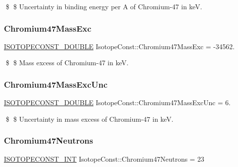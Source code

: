 \$ \$ Uncertainty in binding energy per A of Chromium-\/47 in keV. \mbox{\label{group___isotope_const-_chromium-_cr47_ga3ac7f5e06ba9161b9e15e8467bbdb04a}} 
\subsubsection{\texorpdfstring{Chromium47\+Mass\+Exc}{Chromium47MassExc}}
{\footnotesize\ttfamily \mbox{\hyperlink{group___isotope_const-_macros_ga8f45a7272ce02c0b4c65c44636ed719a}{I\+S\+O\+T\+O\+P\+E\+C\+O\+N\+S\+T\+\_\+\+D\+O\+U\+B\+LE}} Isotope\+Const\+::\+Chromium47\+Mass\+Exc = -\/34562.}

\$ \$ Mass excess of Chromium-\/47 in keV. \mbox{\label{group___isotope_const-_chromium-_cr47_gaa1ed85c141b5e8d51eeac6ac1e14ef1d}} 
\subsubsection{\texorpdfstring{Chromium47\+Mass\+Exc\+Unc}{Chromium47MassExcUnc}}
{\footnotesize\ttfamily \mbox{\hyperlink{group___isotope_const-_macros_ga8f45a7272ce02c0b4c65c44636ed719a}{I\+S\+O\+T\+O\+P\+E\+C\+O\+N\+S\+T\+\_\+\+D\+O\+U\+B\+LE}} Isotope\+Const\+::\+Chromium47\+Mass\+Exc\+Unc = 6.}

\$ \$ Uncertainty in mass excess of Chromium-\/47 in keV. \mbox{\label{group___isotope_const-_chromium-_cr47_ga5e6a0d99a372db529ca728e435f19534}} 
\subsubsection{\texorpdfstring{Chromium47\+Neutrons}{Chromium47Neutrons}}
{\footnotesize\ttfamily \mbox{\hyperlink{group___isotope_const-_macros_ga5f18360b3e99483a35c32d789e62621c}{I\+S\+O\+T\+O\+P\+E\+C\+O\+N\+S\+T\+\_\+\+I\+NT}} Isotope\+Const\+::\+Chromium47\+Neutrons = 23}

